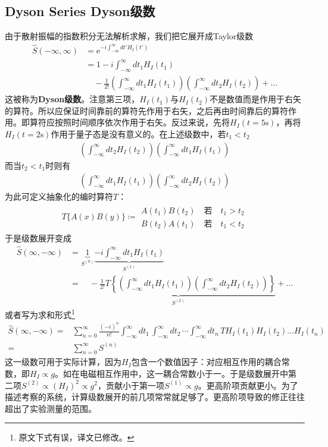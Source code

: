 \subsection[Dyson级数]{Dyson Series \quad Dyson级数}\label{sec9.5.3}
由于散射振幅的指数积分无法解析求解，我们把它展开成Taylor级数
\begin{align}\label{equ9.67}
\hat{S}(-\infty,\infty)&=\text{e}^{-i\int_{-\infty}^\infty dt' H_I(t')}\nonumber\\
&=1-i\int_{-\infty}^\infty dt_1 H_I(t_1)\nonumber\\
&\quad-\frac{1}{2!}\left(\int_{-\infty}^{\infty}dt_1 H_I(t_1)\right)\left(\int_{-\infty}^{\infty}dt_2 H_I(t_2)\right)+\ldots
\end{align}
这被称为{\bfseries Dyson级数}。注意第三项，$H_I(t_1)$与$H_I(t_2)$不是数值而是作用于右矢的算符。所以应保证时间靠前的算符先作用于右矢，之后再由时间靠后的算符作用。即算符应按照时间顺序依次作用于右矢。反过来说，先将$H_I(t=5\text{s})$，再将$H_I(t=2\text{s})$作用于量子态是没有意义的。在上述级数中，若$t_1<t_2$
\begin{gather*}
\left(\int_{-\infty}^{\infty}dt_2 H_I(t_2)\right)\left(\int_{-\infty}^{\infty}dt_1 H_I(t_1)\right)
\end{gather*}
而当$t_2<t_1$时则有
\begin{gather*}
\left(\int_{-\infty}^{\infty}dt_1 H_I(t_1)\right)\left(\int_{-\infty}^{\infty}dt_2 H_I(t_2)\right)
\end{gather*}
为此可定义抽象化的编时算符$T$：
\begin{align}\label{equ9.68}
T\{A(x)B(y)\}\coloneqq\begin{array}{c}A(t_1)B(t_2)\quad\text{若}\quad t_1>t_2\\B(t_2)A(t_1)\quad\text{若}\quad t_1<t_2\end{array}
\end{align}
于是级数展开变成
\begin{align}\label{equ9.69}
\hat{S}(\infty,-\infty)&=\underbrace{1}_{S^{(0)}}\underbrace{-i\int_{-\infty}^{\infty}dt_1H_I(t_1)}_{S^(1)}\nonumber\\
&=\underbrace{\quad-\frac{1}{2!}T\left\{\left(\int_{-\infty}^{\infty}dt_1 H_I(t_1)\right)\left(\int_{-\infty}^{\infty}dt_2 H_I(t_2)\right)\right\}}_{S^{(2)}}+\ldots
\end{align}
或者写为求和形式\footnote{原文下式有误，译文已修改。}
\begin{align}
	\hat{S} (\infty,-\infty) =& \sum_{n=0}^\infty \frac{(-i)^n}{n!} \int_{-\infty}^\infty dt_1\, \int_{-\infty}^\infty dt_2\, \cdots \int_{-\infty}^\infty dt_n\, T H_I(t_1) H_I(t_2) \dots H_I(t_n) \nonumber \\
	=&\sum_{n=0}^\infty S^{(n)} \label{equ9.70}
\end{align}
这一级数可用于实际计算，因为$H_I$包含一个数值因子：对应相互作用的耦合常数，即$H_I\propto g$。如在电磁相互作用中，这一耦合常数小于一。于是级数展开中第二项$S^{(2)}\propto(H_I)^2\propto g^2$，贡献小于第一项$S^{(1)}\propto g$。更高阶项贡献更小。为了描述考察的系统，计算级数展开的前几项常常就足够了。更高阶项导致的修正往往超出了实验测量的范围。

